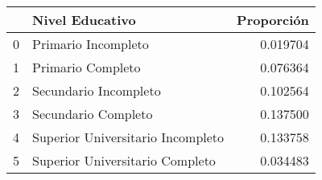 \begin{tabular}{llr}
\toprule
 & Nivel Educativo & Proporción \\
\midrule
0 & Primario Incompleto & 0.019704 \\
1 & Primario Completo & 0.076364 \\
2 & Secundario Incompleto & 0.102564 \\
3 & Secundario Completo & 0.137500 \\
4 & Superior Universitario Incompleto & 0.133758 \\
5 & Superior Universitario Completo & 0.034483 \\
\bottomrule
\end{tabular}
